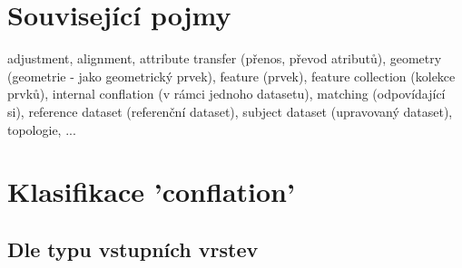 \section{Související pojmy} %
\label{pojmy}

adjustment, alignment, attribute transfer (přenos, převod atributů), geometry (geometrie - jako geometrický prvek), feature (prvek), feature collection (kolekce prvků),
internal conflation (v rámci jednoho datasetu), matching (odpovídající si), reference dataset (referenční dataset), subject dataset (upravovaný dataset), topologie, ... 


\section{Klasifikace 'conflation'}
\label{klasifikace}

\subsection{Dle typu vstupních vrstev}
\label{dle-vstupu}

